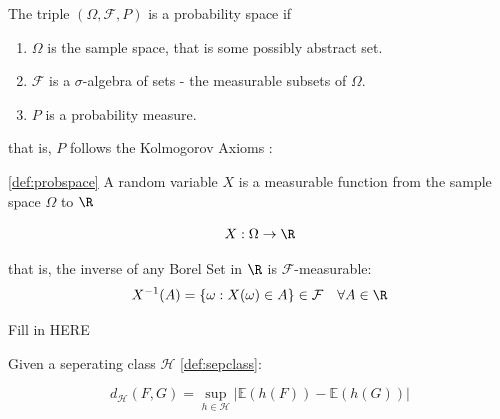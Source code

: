 
\begin{definition}
  \label{def:probspace}
  The triple $(\Omega, \mathcal{F}, P)$ is a probability space if 
  \begin{enumerate}
    \item $\Omega$ is the sample space, that is some possibly abstract set. 
    \item $\mathcal{F}$ is a $\sigma$-algebra of sets - the measurable subsets of $\Omega$. 
    \item $P$ is a probability measure. 
  \end{enumerate}

  that is, $P$ follows the Kolmogorov Axioms : 

\end{definition}

\begin{definition}
  \label{def:rv}
  \ref{def:probspace}
A random variable $X$ is a measurable function from the sample space $\Omega$ to $\R$ 

$$ X : \Omega \to \R $$ 

that is, the inverse of any Borel Set in $\R$ is $\mathcal{F}$-measurable: 
$$ X^{-1} (A) = \{\omega : X(\omega) \in A \} \in \mathcal{F} \quad \forall A \in \R $$ 
\end{definition}

\begin{definition}
  \label{def:sepclass}
 Fill in HERE %
\end{definition}

\begin{definition}
  \label{def:metprobmeasure}
  Given a seperating class $\mathcal{H}$ \ref{def:sepclass}: 

  \[
    d_\mathcal{H}(F,G) = \operatorname{sup}_{h \in \mathcal{H}} | \mathbb{E}(h(F)) - \mathbb{E}(h(G)) |
  \]
\end{definition}


